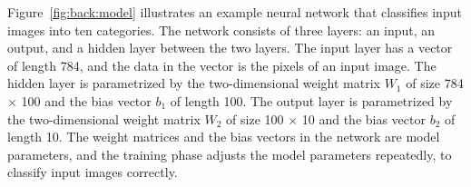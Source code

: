 Figure~\ref{fig:back:model} illustrates an example neural network that
classifies input images into ten categories.
The network consists of three layers: an input, an output, and a hidden layer
between the two layers.
The input layer has a vector of length 784, and the data in the
vector is the pixels of an input image.
The hidden layer is parametrized by the two-dimensional weight matrix $W_1$ of
size 784 $\times$ 100 and the bias vector $b_1$ of length 100.
The output layer is parametrized by the two-dimensional weight matrix $W_2$ of
size 100 $\times$ 10 and the bias vector $b_2$ of length 10.
The weight matrices and the bias vectors in the network are model parameters,
and the training phase adjusts the model parameters repeatedly, to classify
input images correctly.

